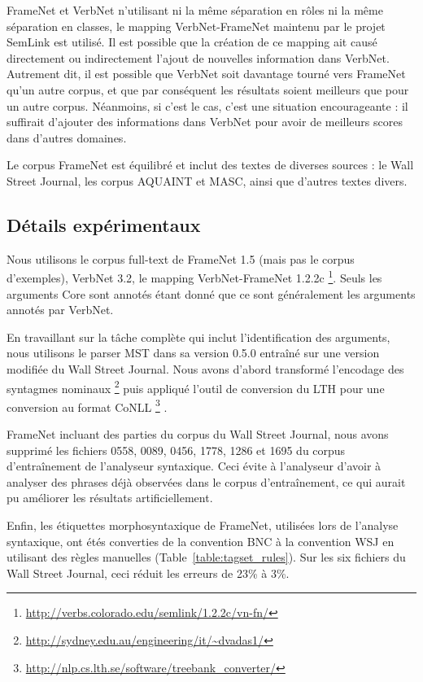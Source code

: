 FrameNet et VerbNet n'utilisant ni la même séparation en rôles ni la même
séparation en classes, le mapping VerbNet-FrameNet maintenu par le projet
SemLink est utilisé. Il est possible que la création de ce mapping ait causé
directement ou indirectement l'ajout de nouvelles information dans VerbNet.
Autrement dit, il est possible que VerbNet soit davantage tourné vers FrameNet
qu'un autre corpus, et que par conséquent les résultats soient meilleurs que
pour un autre corpus. Néanmoins, si c'est le cas, c'est une situation
encourageante : il suffirait d'ajouter des informations dans VerbNet pour avoir
de meilleurs scores dans d'autres domaines.

Le corpus FrameNet est équilibré et inclut des textes de diverses sources : le
Wall Street Journal, les corpus AQUAINT et MASC, ainsi que d'autres textes
divers.

\subsection{Détails expérimentaux}
\label{subsec:corpora_tools}

Nous utilisons le corpus full-text de FrameNet 1.5 (mais pas le corpus
d'exemples), VerbNet 3.2, le mapping VerbNet-FrameNet 1.2.2c
\footnote{\url{http://verbs.colorado.edu/semlink/1.2.2c/vn-fn/}}. Seuls les
arguments Core sont annotés étant donné que ce sont généralement les arguments
annotés par VerbNet.

En travaillant sur la tâche complète qui inclut l'identification des arguments,
nous utilisons le parser MST dans sa version 0.5.0
\citep{mcdonald2006multilingual} entraîné sur une version modifiée du Wall
Street Journal. Nous avons d'abord transformé l'encodage des syntagmes nominaux
\footnote{\url{http://sydney.edu.au/engineering/it/~dvadas1/}}
\citep{vadas2007adding} puis appliqué l'outil de conversion du LTH pour une
conversion au format CoNLL
\footnote{\url{http://nlp.cs.lth.se/software/treebank_converter/}}
\citep{johansson2007extended}.

FrameNet incluant des parties du corpus du Wall Street Journal, nous avons
supprimé les fichiers 0558, 0089, 0456, 1778, 1286 et 1695 du corpus
d'entraînement de l'analyseur syntaxique. Ceci évite à l'analyseur d'avoir à
analyser des phrases déjà observées dans le corpus d'entraînement, ce qui
aurait pu améliorer les résultats artificiellement.

Enfin, les étiquettes morphosyntaxique de FrameNet, utilisées lors de l'analyse
syntaxique, ont étés converties de la convention BNC à la convention WSJ en
utilisant des règles manuelles (Table~\ref{table:tagset_rules}). Sur les six
fichiers du Wall Street Journal, ceci réduit les erreurs de 23\% à 3\%.


